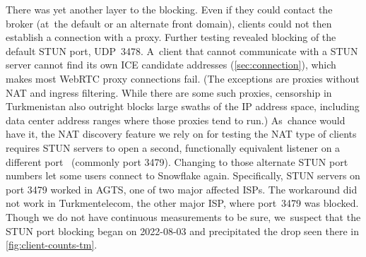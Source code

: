 \documentclass[letterpaper,twocolumn]{article}
\begin{document}
There was yet another layer to the blocking.
Even if they could contact the broker
(at~the default or an alternate front domain),
clients could not then establish a connection with a proxy.
Further testing revealed blocking of the default STUN port, UDP~3478.
A~client that cannot communicate with a STUN server
cannot find its own ICE candidate addresses (\autoref{sec:connection}),
which makes most WebRTC proxy connections fail.
(The exceptions are proxies without NAT and ingress filtering.
While there are some such proxies,
censorship in Turkmenistan also outright blocks
large swaths of the IP address space,
including data center address ranges where those proxies tend to run.)
As~chance would have it, the NAT discovery feature we rely on
for testing the NAT type of clients requires
STUN servers to open a second, functionally equivalent listener
on a different port~\cite[\S 6]{rfc5780} (commonly port 3479).
Changing to those alternate STUN port numbers
let some users connect to Snowflake again.
Specifically, STUN servers on port 3479 worked in AGTS,
one of two major affected ISPs.
The workaround did not work in Turkmentelecom, the other major ISP,
where port~3479 was blocked.
Though we do not have continuous measurements to be sure,
we~suspect that the STUN port blocking began on \mbox{2022-08-03}
and precipitated the drop seen there in \autoref{fig:client-counts-tm}.
\end{document}
